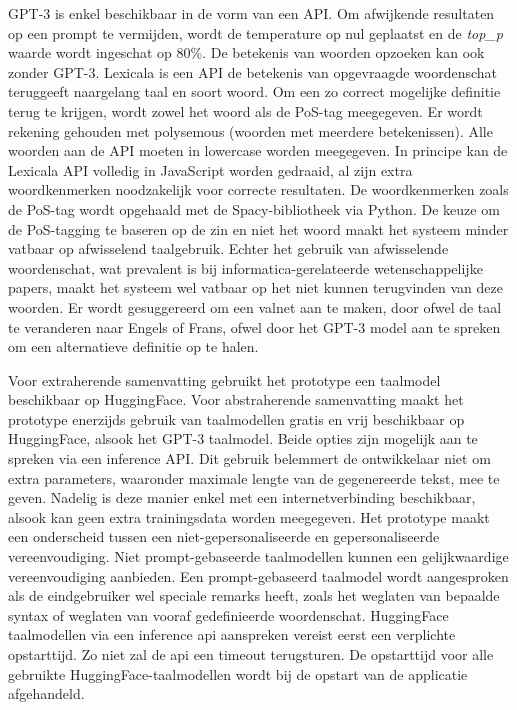 GPT-3 is enkel beschikbaar in de vorm van een API. Om afwijkende resultaten op een prompt te vermijden, wordt de temperature op nul geplaatst en de \textit{top\_p} waarde wordt ingeschat op 80\%. De betekenis van woorden opzoeken kan ook zonder GPT-3. Lexicala is een API de betekenis van opgevraagde woordenschat teruggeeft naargelang taal en soort woord. Om een zo correct mogelijke definitie terug te krijgen, wordt zowel het woord als de PoS-tag meegegeven. Er wordt rekening gehouden met polysemous (woorden met meerdere betekenissen). Alle woorden aan de API moeten in lowercase worden meegegeven. In principe kan de Lexicala API volledig in JavaScript worden gedraaid, al zijn extra woordkenmerken noodzakelijk voor correcte resultaten. De woordkenmerken zoals de PoS-tag wordt opgehaald met de Spacy-bibliotheek via Python. De keuze om de PoS-tagging te baseren op de zin en niet het woord maakt het systeem minder vatbaar op afwisselend taalgebruik. Echter het gebruik van afwisselende woordenschat, wat prevalent is bij informatica-gerelateerde wetenschappelijke papers, maakt het systeem wel vatbaar op het niet kunnen terugvinden van deze woorden. Er wordt gesuggereerd om een valnet aan te maken, door ofwel de taal te veranderen naar Engels of Frans, ofwel door het GPT-3 model aan te spreken om een alternatieve definitie op te halen.

Voor extraherende samenvatting gebruikt het prototype een taalmodel beschikbaar op HuggingFace. Voor abstraherende samenvatting maakt het prototype enerzijds gebruik van taalmodellen gratis en vrij beschikbaar op HuggingFace, alsook het GPT-3 taalmodel. Beide opties zijn mogelijk aan te spreken via een inference API. Dit gebruik belemmert de ontwikkelaar niet om extra parameters, waaronder maximale lengte van de gegenereerde tekst, mee te geven. Nadelig is deze manier enkel met een internetverbinding beschikbaar, alsook kan geen extra trainingsdata worden meegegeven. Het prototype maakt een onderscheid tussen een niet-gepersonaliseerde en gepersonaliseerde vereenvoudiging. Niet prompt-gebaseerde taalmodellen kunnen een gelijkwaardige vereenvoudiging aanbieden. Een prompt-gebaseerd taalmodel wordt aangesproken als de eindgebruiker wel speciale remarks heeft, zoals het weglaten van bepaalde syntax of weglaten van vooraf gedefinieerde woordenschat. HuggingFace taalmodellen via een inference api aanspreken vereist eerst een verplichte opstarttijd. Zo niet zal de api een timeout terugsturen. De opstarttijd voor alle gebruikte HuggingFace-taalmodellen wordt bij de opstart van de applicatie afgehandeld.

